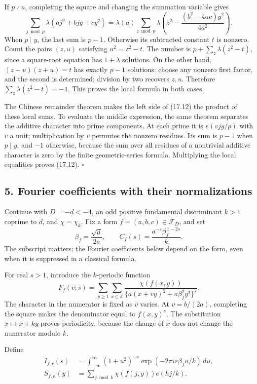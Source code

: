 \documentclass[
  11pt,
  a4paper,
]{article}
\begin{document}
If \(p\nmid a\), completing the square and changing the summation
variable gives \[
 \sum_{j\bmod p}\lambda(aj^2+bjy+cy^2)
 =\lambda(a)\sum_{z\bmod p}
          \lambda\left(z^2-\frac{(b^2-4ac)y^2}{4a^2}\right).
 \tag{17.13}
\] When \(p\mid y\), the last sum is \(p-1\). Otherwise its subtracted
constant \(t\) is nonzero. Count the pairs \((z,u)\) satisfying
\(u^2=z^2-t\). The number is \(p+\sum_z\lambda(z^2-t)\), since a
square-root equation has \(1+\lambda\) solutions. On the other hand,
\((z-u)(z+u)=t\) has exactly \(p-1\) solutions: choose any nonzero first
factor, and the second is determined; division by two recovers \(z,u\).
Therefore \(\sum_z\lambda(z^2-t)=-1\). This proves the local formula in
both cases.

The Chinese remainder theorem makes the left side of (17.12) the product
of these local sums. To evaluate the middle expression, the same theorem
separates the additive character into prime components. At each prime it
is \(e(vjy/p)\) with \(v\) a unit; multiplication by \(v\) permutes the
nonzero residues. Its sum is \(p-1\) when \(p\mid y\), and \(-1\)
otherwise, because the sum over all residues of a nontrivial additive
character is zero by the finite geometric-series formula. Multiplying
the local equalities proves (17.12). \(\square\)

\subsection{5. Fourier coefficients with their
normalizations}\label{fourier-coefficients-with-their-normalizations}

Continue with \(D=-d<-4\), an odd positive fundamental discriminant
\(k>1\) coprime to \(d\), and \(\chi=\chi_k\). Fix a form
\(f=(a,b,c)\in\mathcal F_D\), and set \[
 \beta_f=\frac{\sqrt d}{2a},\qquad
 C_f(s)=\frac{a^{-s}\beta_f^{\,1-2s}}{k}.
 \tag{17.14}
\] The subscript matters: the Fourier coefficients below depend on the
form, even when it is suppressed in a classical formula.

For real \(s>1\), introduce the \(k\)-periodic function \[
 F_f(v;s)=\sum_{y\ge1}\sum_{x\in\mathbb Z}
   \frac{\chi(f(x,y))}
   {\{a(x+vy)^2+a\beta_f^2y^2\}^{s}}.
 \tag{17.15}
\] The character in the numerator is fixed as \(v\) varies. At
\(v=b/(2a)\), completing the square makes the denominator equal to
\(f(x,y)^s\). The substitution \(x\mapsto x+ky\) proves periodicity,
because the change of \(x\) does not change the numerator modulo \(k\).

Define \[
 \begin{aligned}
 I_{f,r}(s)&=\int_{-\infty}^{\infty}
       (1+u^2)^{-s}\exp(-2\pi ir\beta_fu/k)\,du,\\
 S_{f,h}(y)&=\sum_{j\bmod k}\chi(f(j,y))e(hj/k).
 \end{aligned}
 \tag{17.16}
\]
\end{document}
